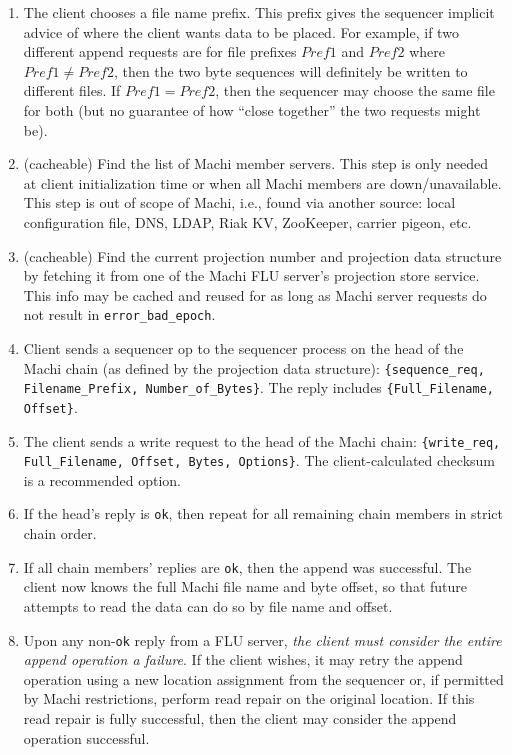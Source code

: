 \documentclass[preprint,10pt]{sigplanconf}
\begin{document}
\begin{enumerate}

\item The client chooses a file name prefix.  This prefix gives the
sequencer implicit advice of where the client wants data to be
placed.  For example, if two different append requests are for file
prefixes $Pref1$ and $Pref2$ where $Pref1 \ne Pref2$, then the two byte
sequences will definitely be written to different files.  If
$Pref1 = Pref2$,
then the sequencer may choose the same file for both (but no
guarantee of how ``close together'' the two requests might be).

\item (cacheable) Find the list of Machi member servers.  This step is
only needed at client initialization time or when all Machi members
are down/unavailable.  This step is out of scope of Machi, i.e., found
via another source: local configuration file, DNS, LDAP, Riak KV, ZooKeeper,
carrier pigeon, etc.

\item (cacheable) Find the current projection number and projection data
structure by fetching it from one of the Machi FLU server's
projection store service.  This info
may be cached and reused for as long as Machi server requests do not
result in {\tt error\_bad\_epoch}.

\item Client sends a sequencer op to the sequencer process on the head of
the Machi chain (as defined by the projection data structure):
{\tt \{sequence\_req, Filename\_Prefix, Number\_of\_Bytes\}}.  The reply
includes {\tt \{Full\_Filename, Offset\}}.

\item The client sends a write request to the head of the Machi chain:
{\tt \{write\_req, Full\_Filename, Offset, Bytes, Options\}}.  The
client-calculated checksum is a recommended option.

\item If the head's reply is {\tt ok}, then repeat for all remaining chain
members in strict chain order.

\item If all chain members' replies are {\tt ok}, then the append was
successful.  The client now knows the full Machi file name and byte
offset, so that future attempts to read the data can do so by file
name and offset.

\item Upon any non-{\tt ok} reply from a FLU server, {\em the client must
consider the entire append operation a failure}.  If the client
wishes, it may retry the append operation using a new location
assignment from the sequencer or, if permitted by Machi restrictions,
perform read repair on the original location.  If this read repair is
fully successful, then the client may consider the append operation
successful.


\end{enumerate}
\end{document}

